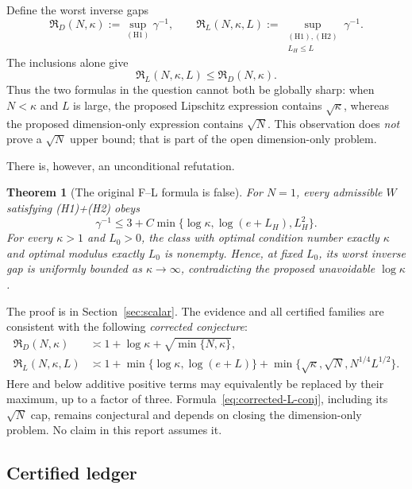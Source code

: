 \documentclass[11pt]{article}
\numberwithin{equation}{section}
\newtheorem{theorem}{Theorem}[section]
\newcommand{\cR}{\mathfrak R}
\begin{document}
Define the worst inverse gaps
\[
 \cR_D(N,\kappa):=\sup_{\mathrm{(H1)}}\gamma^{-1},\qquad
 \cR_L(N,\kappa,L):=\sup_{\substack{\mathrm{(H1),(H2)}\\L_H\le L}}
 \gamma^{-1}.
\]
The inclusions alone give
\begin{equation}\label{eq:monotonicity}
 \cR_L(N,\kappa,L)\le\cR_D(N,\kappa).
\end{equation}
Thus the two formulas in the question cannot both be globally sharp: when
$N<\kappa$ and $L$ is large, the proposed Lipschitz expression contains
$\sqrt\kappa$, whereas the proposed dimension-only expression contains
$\sqrt N$.  This observation does \emph{not} prove a $\sqrt N$ upper bound;
that is part of the open dimension-only problem.

There is, however, an unconditional refutation.

\begin{theorem}[The original F--L formula is false]\label{thm:FL-false}
For $N=1$, every admissible $W$ satisfying (H1)+(H2) obeys
\begin{equation}\label{eq:scalar-upper-intro}
 \gamma^{-1}\le
 3+C\min\{\log\kappa,\log(e+L_H),L_H^2\}.
\end{equation}
For every $\kappa>1$ and $L_0>0$, the class with optimal condition number
exactly $\kappa$ and optimal modulus exactly $L_0$ is nonempty.  Hence, at
fixed $L_0$, its worst inverse gap is uniformly bounded as
$\kappa\to\infty$, contradicting the proposed unavoidable $\log\kappa$.
\end{theorem}

The proof is in Section~\ref{sec:scalar}.  The evidence and all certified
families are consistent with the following \emph{corrected conjecture}:
\begin{align}
 \cR_D(N,\kappa)
 &\asymp 1+\log\kappa+\sqrt{\min\{N,\kappa\}},
 \label{eq:corrected-D-conj}\\
 \cR_L(N,\kappa,L)
 &\asymp 1+\min\{\log\kappa,\log(e+L)\}
 +\min\{\sqrt\kappa,\sqrt N,N^{1/4}L^{1/2}\}.
 \label{eq:corrected-L-conj}
\end{align}
Here and below additive positive terms may equivalently be replaced by their
maximum, up to a factor of three.  Formula~\eqref{eq:corrected-L-conj},
including its $\sqrt N$ cap, remains conjectural and depends on closing the
dimension-only problem.  No claim in this report assumes it.

\subsection*{Certified ledger}
\end{document}
